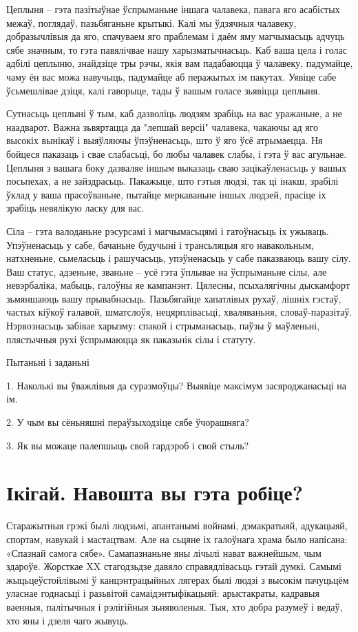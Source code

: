 Цеплыня – гэта пазітыўнае ўспрыманьне іншага чалавека, павага яго асабістых межаў, поглядаў, пазьбяганьне крытыкі. Калі мы ўдзячныя чалавеку, добразычлівыя да яго, спачуваем яго праблемам і даём яму магчымасьць адчуць сябе значным, то гэта павялічвае нашу харызматычнасьць. Каб ваша цела і голас адбілі цеплыню, знайдзіце тры рэчы, якія вам падабаюцца ў чалавеку, падумайце, чаму ён вас можа навучыць, падумайце аб перажытых ім пакутах. Уявіце сабе ўсьмешлівае дзіця, калі гаворыце, тады ў вашым голасе зьявіцца цеплыня.

Сутнасьць цеплыні ў тым, каб дазволіць людзям зрабіць на вас уражаньне, а не наадварот. Важна зьвяртацца да "лепшай версіі" чалавека, чакаючы ад яго высокіх вынікаў і выяўляючы ўпэўненасьць, што ў яго ўсё атрымаецца. Ня бойцеся паказаць і свае слабасьці, бо любы чалавек слабы, і гэта ў вас агульнае. Цеплыня з вашага боку дазваляе іншым выказаць сваю зацікаўленасьць у вашых посьпехах, а не зайздрасьць. Пакажыце, што гэтыя людзі, так ці інакш, зрабілі ўклад у ваша прасоўваньне, пытайце меркаваньне іншых людзей, прасіце іх зрабіць невялікую ласку для вас.

Сіла – гэта валоданьне рэсурсамі і магчымасьцямі і гатоўнасьць іх ужываць. Упэўненасьць у сабе, бачаньне будучыні і трансьляцыя яго навакольным, натхненьне, сьмеласьць і рашучасьць, упэўненасьць у сабе паказваюць вашу сілу. Ваш статус, адзеньне, званьне – усё гэта ўплывае на ўспрыманьне сілы, але невэрбаліка, мабыць, галоўны яе кампанэнт. Цялесны, псыхалягічны дыскамфорт зьмяншаюць вашу прывабнасьць. Пазьбягайце хапатлівых рухаў, лішніх гэстаў, частых кіўкоў галавой, шматслоўя, нецярплівасьці, хваляваньня, словаў-паразітаў. Нэрвознасьць забівае харызму: спакой і стрыманасьць, паўзы ў маўленьні, плястычныя рухі ўспрымаюцца як паказьнік сілы і статуту.

Пытаньні і заданьні

1. Наколькі вы ўважлівыя да суразмоўцы? Выявіце максімум засяроджанасьці на ім.

2. У чым вы сёньняшні пераўзыходзіце сябе ўчорашняга?

3. Як вы можаце палепшыць свой гардэроб і свой стыль?


\section{Ікігай. Навошта вы гэта робіце?}

Старажытныя грэкі былі людзьмі, апантанымі войнамі, дэмакратыяй, адукацыяй, спортам, навукай і мастацтвам. Але на сьцяне іх галоўнага храма было напісана: «Спазнай самога сябе». Самапазнаньне яны лічылі нават важнейшым, чым здароўе. Жорсткае XX стагодзьдзе давяло справядлівасьць гэтай думкі. Самымі жыцьцеўстойлівымі ў канцэнтрацыйных лягерах былі людзі з высокім пачуцьцём уласнае годнасьці і разьвітой самаідэнтыфікацыяй: арыстакраты, кадравыя ваенныя, палітычныя і рэлігійныя зьняволеныя. Тыя, хто добра разумеў і ведаў, хто яны і дзеля чаго жывуць.

